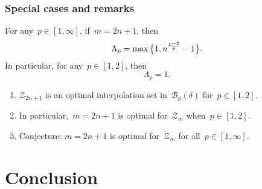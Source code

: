 \documentclass{polyu-presentation}
\begin{document}
\begin{frame}
    \frametitle{Special cases and remarks}


    \begin{block}{}
        For any~$p \in [1, \infty]$, if~$m = 2n + 1$, then
        \begin{equation*}
            \Lambda_p = \max \set[\big]{1, n^{\frac{p - 2}{p}} - 1}.
        \end{equation*}
        In particular, for any~$p \in [1, 2]$, then
        \begin{equation*}
            \Lambda_p = 1.
        \end{equation*}
    \end{block}

    \medskip

    \begin{enumerate}
        \item $\mathcal{Z}_{2n + 1}$ is an \alert{optimal interpolation set} in~$\mathcal{B}_p(\delta)$ for~$p \in [1, 2]$.
        \item In particular,~$m = 2n + 1$ is optimal for~$\mathcal{Z}_m$ when~$p \in [1, 2]$.
        \item \alert{Conjecture}: $m = 2n + 1$ is optimal for~$\mathcal{Z}_m$ for all~$p \in [1, \infty]$.
    \end{enumerate}
\end{frame}

\section{Conclusion}
\end{document}
